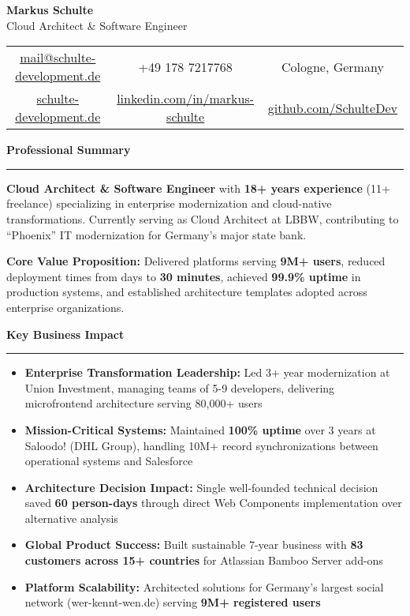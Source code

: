 \documentclass[11pt,a4paper]{article}
\newcommand{\sectiontitle}[1]{%
  \vspace{8pt}
  {\color{darkblue}\Large\bfseries #1}
  \vspace{4pt}
  \hrule
  \vspace{6pt}
}
\begin{document}
\begin{center}
  {\Huge\bfseries\color{darkblue} Markus Schulte}\\[4pt]
  {\Large Cloud Architect \& Software Engineer}\\[8pt]
  \begin{tabular}{c|c|c}
    \href{mailto:mail@schulte-development.de}{mail@schulte-development.de} & 
    +49 178 7217768 & 
    Cologne, Germany\\
    \href{https://schulte-development.de}{schulte-development.de} & 
    \href{https://linkedin.com/in/markus-schulte/}{linkedin.com/in/markus-schulte} & 
    \href{https://github.com/SchulteDev}{github.com/SchulteDev}
  \end{tabular}
\end{center}

\vspace{6pt}

\sectiontitle{Professional Summary}

\textbf{Cloud Architect \& Software Engineer} with \textbf{18+ years experience} (11+ freelance) specializing in enterprise modernization and cloud-native transformations. Currently serving as Cloud Architect at LBBW, contributing to ``Phoenix'' IT modernization for Germany's major state bank.

\textbf{Core Value Proposition:} Delivered platforms serving \textbf{9M+ users}, reduced deployment times from days to \textbf{30 minutes}, achieved \textbf{99.9\% uptime} in production systems, and established architecture templates adopted across enterprise organizations.

\vspace{4pt}

\sectiontitle{Key Business Impact}

\begin{itemize}
\item \textbf{Enterprise Transformation Leadership:} Led 3+ year modernization at Union Investment, managing teams of 5-9 developers, delivering microfrontend architecture serving 80,000+ users
\item \textbf{Mission-Critical Systems:} Maintained \textbf{100\% uptime} over 3 years at Saloodo! (DHL Group), handling 10M+ record synchronizations between operational systems and Salesforce
\item \textbf{Architecture Decision Impact:} Single well-founded technical decision saved \textbf{60 person-days} through direct Web Components implementation over alternative analysis
\item \textbf{Global Product Success:} Built sustainable 7-year business with \textbf{83 customers across 15+ countries} for Atlassian Bamboo Server add-ons
\item \textbf{Platform Scalability:} Architected solutions for Germany's largest social network (wer-kennt-wen.de) serving \textbf{9M+ registered users}
\end{itemize}
\end{document}
